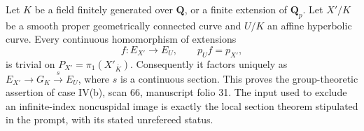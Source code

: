 \begin{proposition}
\label{A:proper-affine}
Let $K$ be a field finitely generated over $\mathbf Q$, or a finite
extension of $\mathbf Q_p$. Let $X'/K$ be a smooth proper
geometrically connected curve and $U/K$ an affine hyperbolic curve.
Every continuous homomorphism of extensions
\[
 f:E_{X'}\longrightarrow E_U,\qquad p_Uf=p_{X'},
\]
is trivial on $P_{X'}=\pi_1(X'_{\overline K})$. Consequently it
factors uniquely as $E_{X'}\to G_K\xrightarrow{s}E_U$, where
$s$ is a continuous section. This proves the group-theoretic assertion
of case IV(b), scan 66, manuscript folio 31. The input used to exclude
an infinite-index noncuspidal image is exactly the local section
theorem stipulated in the prompt, with its stated unrefereed status.
\end{proposition}
